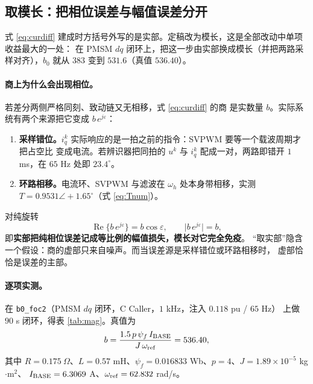 \documentclass[11pt,a4paper]{ctexart}
\newcommand{\RE}{\operatorname{Re}}
\begin{document}
\subsection{取模长：把相位误差与幅值误差分开}
\label{sec:mag}

式 \eqref{eq:curdiff} 建成时方括号外写的是实部。定稿改为模长，这是全部改动中单项收益最大的一处：
在 PMSM $dq$ 闭环上，把这一步由实部换成模长（并把两路采样对齐），$\hat b_0$ 就从 $383$ 变到 $531.6$（真值 $536.40$）。

\paragraph{商上为什么会出现相位。}若差分两侧严格同刻、致动链又无相移，式 \eqref{eq:curdiff} 的商
是实数量 $b$。实际系统有两个来源把它变成 $b\,e^{j\varepsilon}$：

\begin{enumerate}
\item \textbf{采样错位。}$i_q^k$ 实际响应的是一拍之前的指令：SVPWM 要等一个载波周期才把占空比
变成电流。若辨识器把同拍的 $u^k$ 与 $i_q^k$ 配成一对，两路即错开 $1$ ms，在 $65$ Hz 处即 $23.4^\circ$。
\item \textbf{环路相移。}电流环、SVPWM 与滤波在 $\omega_h$ 处本身带相移，实测
$T=0.9531\angle+1.65^\circ$（式 \eqref{eq:Tnum}）。
\end{enumerate}

对纯旋转
\begin{equation}
\RE\{b\,e^{j\varepsilon}\}=b\cos\varepsilon,
\qquad
\big|b\,e^{j\varepsilon}\big|=b ,
\label{eq:magre}
\end{equation}
即\textbf{实部把纯相位误差记成等比例的幅值损失，模长对它完全免疫}。
“取实部”隐含一个假设：商的虚部只来自噪声。而当误差源是采样错位或环路相移时，
虚部恰恰是误差的主部。

\paragraph{逐项实测。}在 \texttt{b0\_foc2}（PMSM $dq$ 闭环，C Caller，$1$ kHz，注入 $0.118$ pu / $65$ Hz）
上做 $90$ s 闭环，得表 \ref{tab:mag}。真值为
\begin{equation}
b=\frac{1.5\,p\,\psi_f\,I_{\rm BASE}}{J\,\omega_{\rm ref}}=536.40 ,
\label{eq:focb}
\end{equation}
其中 $R=0.175\ \Omega$、$L=0.57$ mH、$\psi_f=0.016833$ Wb、$p=4$、$J=1.89\times10^{-5}$ kg$\cdot$m$^2$、
$I_{\rm BASE}=6.3069$ A、$\omega_{\rm ref}=62.832$ rad/s。
\end{document}
